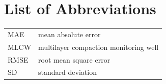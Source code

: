 \section*{List of Abbreviations}

\noindent
\begin{tabularx}{\textwidth}{@{}lX@{}}
  MAE  & mean absolute error \\
  MLCW & multilayer compaction monitoring well \\
  RMSE & root mean square error \\
  SD   & standard deviation \\
\end{tabularx}
